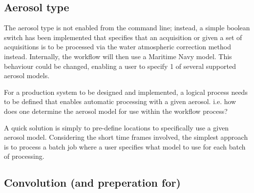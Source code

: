\documentclass[a4paper]{article}
\begin{document}
  \subsection{Aerosol type}
    \begin{flushleft}
      The aerosol type is not enabled from the command line; instead, a simple boolean switch has been implemented that specifies that an acquisition or given a set of acquisitions is to be processed via the water atmospheric correction method instead. Internally, the workflow will then use a Maritime Navy model. This behaviour could be changed, enabling a user to specify 1 of several supported aerosol models. \par
      For a production system to be designed and implemented, a logical process needs to be defined that enables automatic processing with a given aerosol. i.e. how does one determine the aerosol model for use within the workflow process? \par
      A quick solution is simply to pre-define locations to specifically use a given aerosol model. Considering the short time frames involved, the simplest approach is to process a batch job where a user specifies what model to use for each batch of processing.
    \end{flushleft}

  \subsection{Convolution (and preperation for)}
\end{document}
